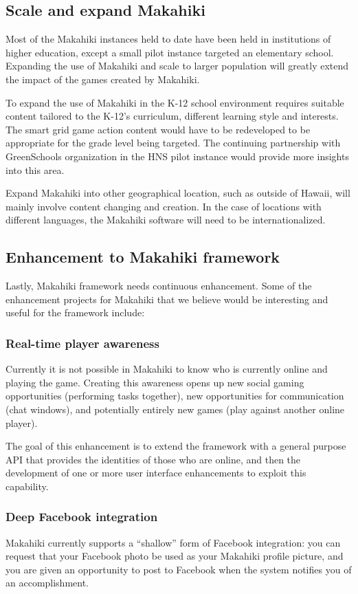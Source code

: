 \subsection{Scale and expand Makahiki}

Most of the Makahiki instances held to date have been held in institutions of higher education, except a small pilot instance targeted an elementary school. Expanding the use of Makahiki and scale to larger population will greatly extend the impact of the games created by Makahiki.

To expand the use of Makahiki in the K-12 school environment requires suitable content tailored to the K-12's curriculum, different learning style and interests. The smart grid game action content would have to be redeveloped to be appropriate for the grade level being targeted. The continuing partnership with GreenSchools organization in the HNS pilot instance would provide more insights into this area.

Expand Makahiki into other geographical location, such as outside of Hawaii, will mainly involve content changing and creation. In the case of locations with different languages, the Makahiki software will need to be internationalized. 

\subsection{Enhancement to Makahiki framework}
Lastly, Makahiki framework needs continuous enhancement. Some of the enhancement projects for Makahiki that we believe would be interesting and useful for the framework include:

\subsubsection{Real-time player awareness}
Currently it is not possible in Makahiki to know who is currently online and playing the game. Creating this awareness opens up new social gaming opportunities (performing tasks together), new opportunities for communication (chat windows), and potentially entirely new games (play against another online player). 

The goal of this enhancement is to extend the framework with a general purpose API that provides the identities of those who are online, and then the development of one or more user interface enhancements to exploit this capability.

\subsubsection{Deep Facebook integration}
Makahiki currently supports a ``shallow'' form of Facebook integration: you can request that your Facebook photo be used as your Makahiki profile picture, and you are given an opportunity to post to Facebook when the system notifies you of an accomplishment. 

